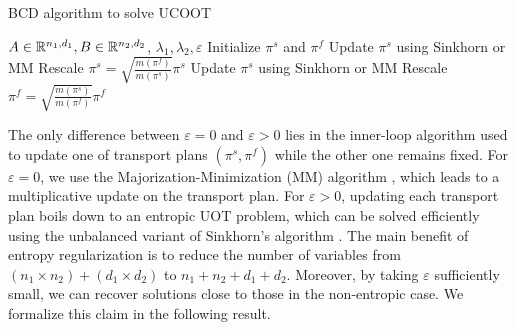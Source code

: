 \begin{algorithm}[t]
    \caption{BCD algorithm to solve UCOOT \label{alg:bcd}}
    \begin{algorithmic}
       $A \in \mathbb R^{n_1, d_1}, B \in \mathbb R^{n_2, d_2}$, $\lambda_1, \lambda_2, \varepsilon$
      \STATE Initialize $\pi^s$ and $\pi^f$
      \REPEAT
      \STATE Update $\pi^s$ using Sinkhorn or MM
      \STATE Rescale $\pi^s = \sqrt{\frac{m(\pi^f)}{m(\pi^s)}} \pi^s$
      \STATE Update $\pi^s$ using Sinkhorn or MM
      \STATE Rescale $\pi^f = \sqrt{\frac{m(\pi^s)}{m(\pi^f)}} \pi^f$
	\end{algorithmic}
\end{algorithm}
The only difference between $\varepsilon = 0$ and $\varepsilon > 0$
lies in the inner-loop algorithm used to update one of transport plans $(\pi^s, \pi^f)$
while the other one remains fixed.
For $\varepsilon=0$, we use the Majorization-Minimization (MM) algorithm \citep{Chapel21},
which leads to a multiplicative update on the transport plan.
For $\varepsilon > 0$, updating each transport plan boils down to an entropic UOT problem,
which can be solved efficiently using the unbalanced variant of Sinkhorn's algorithm \citep{Chizat18a}.
The main benefit of entropy regularization is to reduce the number of variables
from $(n_1 \times n_2) + (d_1 \times d_2)$ to $n_1 + n_2 + d_1 + d_2$.
Moreover, by taking $\varepsilon$ sufficiently small, we can recover solutions
close to those in the non-entropic case. We formalize this claim in the following result.
